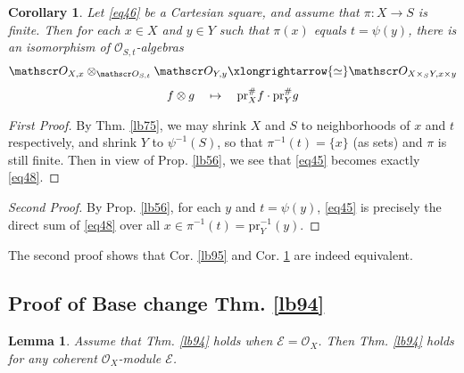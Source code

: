 \documentclass[12pt,b5paper,notitlepage]{report}
\theoremstyle{definition}
\theoremstyle{plain}
\newtheorem{co}[df]{Corollary}
\newtheorem{lm}[df]{Lemma}
\newcommand{\scr}{\mathscr}
\newcommand{\pr}{\mathrm {pr}}
\numberwithin{equation}{section}
\begin{document}
\begin{co}\label{lb97}
Let \eqref{eq46} be a Cartesian square, and assume that $\pi:X\rightarrow S$ is finite. Then for each $x\in X$ and $y\in Y$ such that $\pi(x)$ equals $t=\psi(y)$, there is an isomorphism of $\scr O_{S,t}$-algebras
 \begin{gather}\label{eq48}
\begin{gathered}
\scr O_{X,x}\otimes_{\scr O_{S,t}}\scr O_{Y,y}\xlongrightarrow{\simeq} \scr O_{X\times_SY,x\times y}\\[0.8ex]
f\otimes g\quad\mapsto\quad \pr_X^\#f\cdot \pr_Y^\#g
\end{gathered}
\end{gather}
\end{co}

\begin{proof}[First Proof]
By Thm. \ref{lb75}, we may shrink $X$ and $S$ to neighborhoods of $x$ and $t$ respectively, and shrink $Y$ to $\psi^{-1}(S)$, so that $\pi^{-1}(t)=\{x\}$ (as sets) and $\pi$ is still finite. Then in view of Prop. \ref{lb56}, we see that \eqref{eq45} becomes exactly \eqref{eq48}.
\end{proof}

\begin{proof}[Second Proof]
By Prop. \ref{lb56}, for each $y$ and $t=\psi(y)$, \eqref{eq45} is precisely the direct sum of \eqref{eq48} over all $x\in \pi^{-1}(t)=\pr_Y^{-1}(y)$. 
\end{proof}

The second proof shows that Cor. \ref{lb95} and Cor. \ref{lb97} are indeed equivalent.




\subsection{Proof of Base change Thm. \ref{lb94}}


\begin{lm}\label{lb96}
Assume that Thm. \ref{lb94} holds when $\scr E=\scr O_X$. Then Thm. \ref{lb94} holds for any coherent $\scr O_X$-module $\scr E$.
\end{lm}
\end{document}
